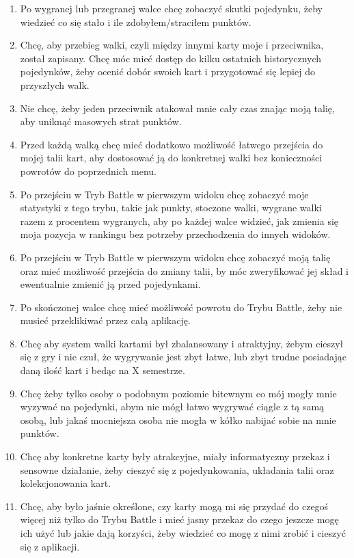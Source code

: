 \documentclass{article}
\begin{document}
\begin{tcolorbox}
\begin{enumerate}
\begin{enumerate}
\begin{enumerate}
                            \item Po wygranej lub przegranej walce chcę zobaczyć skutki pojedynku, żeby wiedzieć co się stało i ile zdobyłem/straciłem punktów.
                            \item Chcę, aby przebieg walki, czyli między innymi karty moje i przeciwnika, został zapisany. Chcę móc mieć dostęp do kilku ostatnich historycznych pojedynków, żeby ocenić dobór swoich kart i przygotować się lepiej do przyszłych walk.
                            \item Nie chcę, żeby jeden przeciwnik atakował mnie cały czas znając moją talię, aby uniknąć masowych strat punktów.
                            \item Przed każdą walką chcę mieć dodatkowo możliwość łatwego przejścia do mojej talii kart, aby dostosować ją do konkretnej walki bez konieczności powrotów do poprzednich menu.
                            \item Po przejściu w Tryb Battle w pierwszym widoku chcę zobaczyć moje statystyki z tego trybu, takie jak punkty, stoczone walki, wygrane walki razem z procentem wygranych, aby po każdej walce widzieć, jak zmienia się moja pozycja w rankingu bez potrzeby przechodzenia do innych widoków.
                            \item Po przejściu w Tryb Battle w pierwszym widoku chcę zobaczyć moją talię oraz mieć możliwość przejścia do zmiany talii, by móc zweryfikować jej skład i ewentualnie zmienić ją przed pojedynkami.
                            \item Po skończonej walce chcę mieć możliwość powrotu do Trybu Battle, żeby nie musieć przeklikiwać przez całą aplikację.
                            \item Chcę aby system walki kartami był zbalansowany i atraktyjny, żebym cieszył się z gry i nie czuł, że wygrywanie jest zbyt łatwe, lub zbyt trudne posiadając daną ilość kart i bedąc na X semestrze.
                            \item Chcę żeby tylko osoby o podobnym poziomie bitewnym co mój mogły mnie wyzywać na pojedynki, abym nie mógł łatwo wygrywać ciągle z tą samą osobą, lub jakaś mocniejsza osoba nie mogła w kółko nabijać sobie na mnie punktów.
                            \item Chcę aby konkretne karty były atrakcyjne, miały informatyczny przekaz i sensowne działanie, żeby cieszyć się z pojedynkowania, układania talii oraz kolekcjonowania kart.
                            \item Chcę, aby było jaśnie określone, czy karty mogą mi się przydać do czegoś więcej niż tylko do Trybu Battle i mieć jasny przekaz do czego jeszcze mogę ich użyć lub jakie dają korzyści, żeby wiedzieć co mogę z nimi zrobić i cieszyć się z aplikacji.

\end{enumerate}
\end{enumerate}
\end{enumerate}
\end{tcolorbox}
\end{document}
